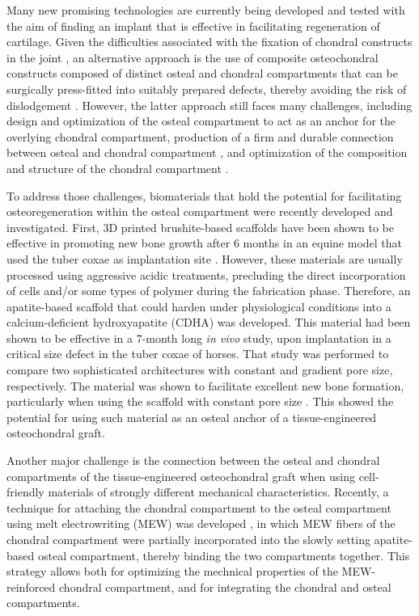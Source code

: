 \documentclass[twocolumn, serif, empirical, authordate, seplic]{jote-article}
\begin{document}
Many new promising technologies \parencite{Johnstone2019, Patel2019} are currently being developed and tested with the aim of finding an implant that is effective in facilitating regeneration of cartilage. Given the difficulties associated with the fixation of chondral constructs in the joint \parencite{Gotterbarm2008, Mancini2017}, an alternative approach is the use of composite osteochondral constructs composed of distinct osteal and chondral compartments that can be surgically press-fitted into suitably prepared defects, thereby avoiding the risk of dislodgement \parencite{Martin2007}. However, the latter approach still faces many challenges, including design and optimization of the osteal compartment to act as an anchor for the overlying chondral compartment, production of a firm and durable connection between osteal and chondral compartment \parencite{Boushell2017}, and optimization of the composition and structure of the chondral compartment \parencite{Diekman2013, Lee2014}.

To address those challenges, biomaterials that hold the potential for facilitating osteoregeneration within the osteal compartment were recently developed and investigated. First, 3D printed brushite-based scaffolds have been shown to be effective in promoting new bone growth after 6 months in an equine model that used the tuber coxae as implantation site \parencite{VindasBolanos2020}. However, these materials are usually processed using aggressive acidic treatments, precluding the direct incorporation of cells and/or some types of polymer during the fabrication phase. Therefore, an apatite-based scaffold that could harden under physiological conditions into a calcium-deficient hydroxyapatite (CDHA) was developed. This material had been shown to be effective in a 7-month long \emph{in vivo} study, upon implantation in a critical size defect in the tuber coxae of horses. That study was performed to compare two sophisticated architectures with constant and gradient pore size, respectively. The material was shown to facilitate excellent new bone formation, particularly when using the scaffold with constant pore size \parencite{Diloksumpan2020a}. This showed the potential for using such material as an osteal anchor of a tissue-engineered osteochondral graft.

Another major challenge is the connection between the osteal and chondral compartments of the tissue-engineered osteochondral graft when using cell-friendly materials of strongly different mechanical characteristics. Recently, a technique for attaching the chondral compartment to the osteal compartment using melt electrowriting (MEW) was developed \parencite{Diloksumpan2020}, in which MEW fibers of the chondral compartment were partially incorporated into the slowly setting apatite-based osteal compartment, thereby binding the two compartments together. This strategy allows both for optimizing the mechnical properties of the MEW-reinforced chondral compartment, and for integrating the chondral and osteal compartments.
\end{document}
